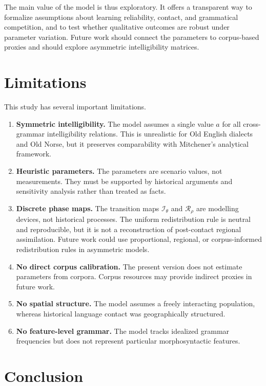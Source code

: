 \documentclass[11pt]{article}
\begin{document}
The main value of the model is thus exploratory. It offers a transparent way to formalize assumptions about learning reliability, contact, and grammatical competition, and to test whether qualitative outcomes are robust under parameter variation. Future work should connect the parameters to corpus-based proxies and should explore asymmetric intelligibility matrices.

\section{Limitations}

This study has several important limitations.

\begin{enumerate}
    \item \textbf{Symmetric intelligibility.} The model assumes a single value $a$ for all cross-grammar intelligibility relations. This is unrealistic for Old English dialects and Old Norse, but it preserves comparability with Mitchener's analytical framework.
    \item \textbf{Heuristic parameters.} The parameters are scenario values, not measurements. They must be supported by historical arguments and sensitivity analysis rather than treated as facts.
    \item \textbf{Discrete phase maps.} The transition maps $\mathcal I_\theta$ and $\mathcal R_\rho$ are modelling devices, not historical processes. The uniform redistribution rule is neutral and reproducible, but it is not a reconstruction of post-contact regional assimilation. Future work could use proportional, regional, or corpus-informed redistribution rules in asymmetric models.
    \item \textbf{No direct corpus calibration.} The present version does not estimate parameters from corpora. Corpus resources may provide indirect proxies in future work.
    \item \textbf{No spatial structure.} The model assumes a freely interacting population, whereas historical language contact was geographically structured.
    \item \textbf{No feature-level grammar.} The model tracks idealized grammar frequencies but does not represent particular morphosyntactic features.
\end{enumerate}

\section{Conclusion}
\end{document}
